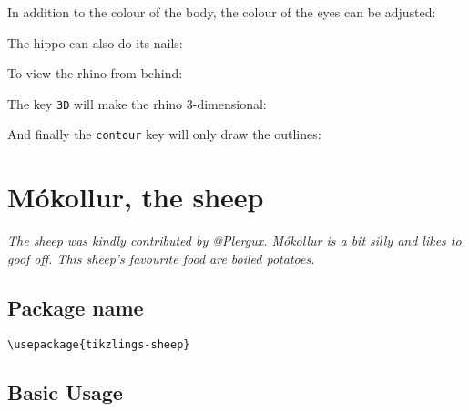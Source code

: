 \documentclass[parskip=half]{scrartcl}
\begin{document}
In addition to the colour of the body, the colour of the eyes can be adjusted:
\begin{tcblisting}{}
\rhino[eye=red]
\end{tcblisting}
\begin{tcblisting}{}
\rhino[pupil=red]
\end{tcblisting}

The hippo can also do its nails:
\begin{tcblisting}{}
\rhino[toes=red]
\end{tcblisting}

To view the rhino from behind:
\begin{tcblisting}{}
\rhino[back]
\end{tcblisting}

The key \lstinline|3D| will make the rhino 3-dimensional:
\begin{tcblisting}{}
\rhino[3D]
\end{tcblisting}

And finally the \lstinline|contour| key will only draw the outlines:
\begin{tcblisting}{}
\rhino[contour=black]
\end{tcblisting}

%
%
\clearpage
\section[Sheep]{Mókollur, the sheep}

\emph{The sheep was kindly contributed by @Plergux. Mókollur is a bit silly and likes to goof off. This sheep's favourite food are boiled potatoes.}

\subsection{Package name}

\begin{tcolorbox}[lower separated=false, lefthand width=.8\linewidth]
\vspace*{0.5cm}
\lstinline|\usepackage{tikzlings-sheep}| 
\vspace*{0.5cm}
\end{tcolorbox}

\subsection{Basic Usage}
\end{document}
